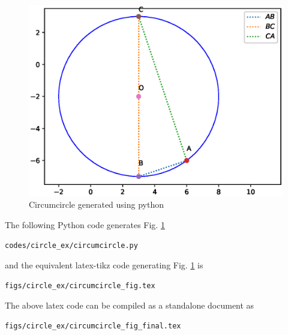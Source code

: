 \begin{enumerate}[label=\thesubsection.\arabic*.,ref=\thesubsection.\theenumi]
\begin{figure}[!ht]
\centering
\includegraphics[width=\columnwidth]{./figs/circle_ex/circumcircle.eps}
\caption{Circumcircle generated using python}
\label{fig:Circumcircle2_circle_ex}
\end{figure} 

\solution The  following Python code generates Fig. \ref{fig:Circumcircle2_circle_ex}

\begin{lstlisting}
codes/circle_ex/circumcircle.py
\end{lstlisting}

and the equivalent latex-tikz code generating Fig. \ref{fig:Circumcircle2_circle_ex} is 
\begin{lstlisting}
figs/circle_ex/circumcircle_fig.tex
\end{lstlisting}
%
The above latex code can be compiled as a standalone document as
\begin{lstlisting}
figs/circle_ex/circumcircle_fig_final.tex
\end{lstlisting}
\end{enumerate}

